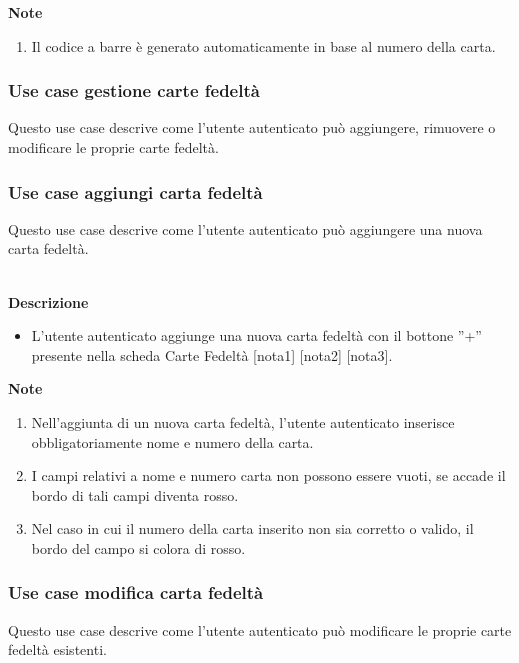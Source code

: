 \documentclass[a4paper,12pt]{article}
\begin{document}
\textbf{Note}
\begin{enumerate} \setlength\itemsep{0.01em}
\item Il codice a barre è generato automaticamente in base al numero della carta.
\end{enumerate}


\subsubsection*{Use case gestione carte fedeltà}

 Questo use case descrive come l'utente autenticato può aggiungere, rimuovere o modificare le proprie carte fedeltà.
 




\subsubsection*{Use case aggiungi carta fedeltà}

 Questo use case descrive come l'utente autenticato può aggiungere una nuova carta fedeltà.
 
\textbf{\\Descrizione}
\begin{itemize} \setlength\itemsep{0.01em}
\item L'utente autenticato aggiunge una nuova carta fedeltà con il bottone ''+'' presente nella scheda Carte Fedeltà [nota1] [nota2] [nota3].
\end{itemize}

\textbf{Note}
\begin{enumerate} \setlength\itemsep{0.01em}
\item Nell'aggiunta di un nuova carta fedeltà, l'utente autenticato inserisce obbligatoriamente nome e numero della carta.
\item I campi relativi a nome e numero carta non possono essere vuoti, se accade il bordo di tali campi diventa rosso.
\item Nel caso in cui il numero della carta inserito non sia corretto o valido, il bordo del campo si colora di rosso.
\end{enumerate}




\subsubsection*{Use case modifica carta fedeltà}

 Questo use case descrive come l'utente autenticato può modificare le proprie carte fedeltà esistenti.
 
\end{document}
